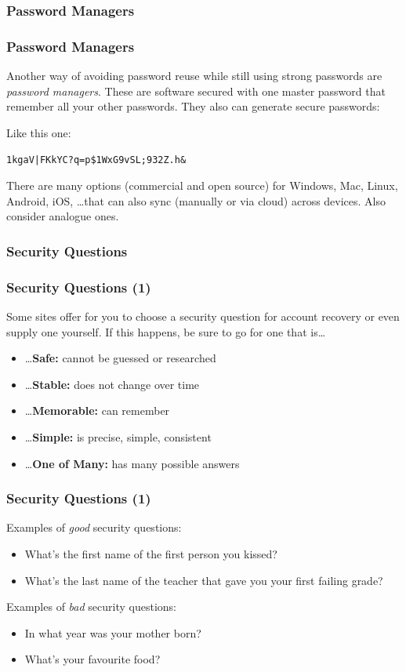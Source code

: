 \documentclass[aspectratio=169,dvipsnames]{beamer}
\begin{document}
\subsubsection{Password Managers}

\begin{frame}
\frametitle{Password Managers}
Another way of avoiding password reuse while still using strong passwords are \emph{password managers}. These are software secured with one master password that remember all your other passwords. They also can generate secure passwords:
\pause\bigskip

Like this one:
\begin{center}
\texttt{1kgaV|FKkYC?q=p\$1WxG9vSL;932Z.h\&}
\end{center}
\pause\bigskip

There are many options (commercial and open source) for Windows, Mac, Linux, Android, iOS, \dots that can also sync (manually or via cloud) across devices. Also consider analogue ones.
\end{frame}

\subsubsection{Security Questions}

\begin{frame}
\frametitle{Security Questions (1)}

Some sites offer for you to choose a security question for account recovery or even supply one yourself. If this happens, be sure to go for one that is\dots
\bigskip

\begin{itemize}
\pause\item\dots \textbf{Safe:} cannot be guessed or researched
\pause\item\dots \textbf{Stable:} does not change over time
\pause\item\dots \textbf{Memorable:} can remember
\pause\item\dots \textbf{Simple:} is precise, simple, consistent
\pause\item\dots \textbf{One of Many:} has many possible answers
\end{itemize}
\end{frame}

\begin{frame}
\frametitle{Security Questions (1)}
Examples of \emph{good} security questions:
\medskip
\begin{itemize}
\item What's the first name of the first person you kissed?
\item What's the last name of the teacher that gave you your first failing grade?
\end{itemize}
\bigskip

Examples of \emph{bad} security questions:
\begin{itemize}
\item In what year was your mother born?
\item What's your favourite food?
\end{itemize}
\end{frame}
\end{document}
